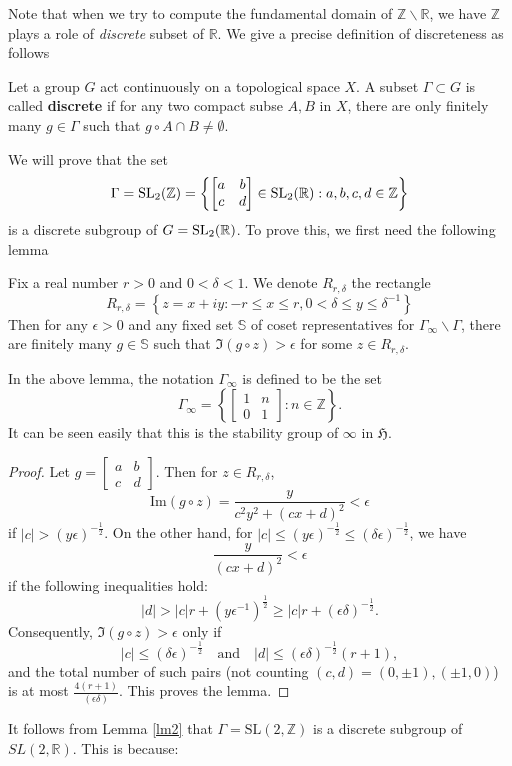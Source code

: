 Note that when we try to compute the fundamental domain of $\mathbb{Z}\backslash \mathbb{R}$, we have $\mathbb{Z}$ plays a role of
\textit{discrete} subset of $\mathbb{R}$. We give a precise definition of discreteness as follows
\begin{definition}
  Let a group $G$ act continuously on a topological space $X$. A subset $\Gamma \subset G$ is called \textbf{discrete} if for any two compact subse
  $A,B$ in $X$, there are only finitely many $g \in \Gamma$ such that $g \circ A \cap B \ne \emptyset$.
\end{definition}
We will prove that the set
\[\Gamma = \operatorname{SL_2(\mathbb{Z})} = \left\lbrace \begin{bmatrix}
    a & b \\
    c & d
  \end{bmatrix} \in \operatorname{SL_2(\mathbb{R})}: a, b, c, d \in \mathbb{Z}\right\rbrace\]
is a discrete subgroup of $G = \operatorname{SL_2(\mathbb{R})}$.
To prove this, we first need the following lemma
\begin{lemma}\label{lm2}
  Fix a real number $r>0$ and $0<\delta<1$. We denote $R_{r,\delta}$ the rectangle
  \[R_{r,\delta} = \left\lbrace z = x+iy: -r \le x \le r, 0 <\delta \le y \le \delta^{-1}\right\rbrace\]
  Then for any $\epsilon >0$ and any fixed set $\mathbb{S}$ of coset representatives for $\Gamma_\infty\backslash \Gamma$, there are finitely
  many $g \in \mathbb{S}$ such that $\Im(g\circ z)>\epsilon$ for some $z \in R_{r,\delta}$.
\end{lemma}
In the above lemma, the notation $\Gamma_\infty$ is defined to be the set
\[ \Gamma_\infty = \left\lbrace\begin{bmatrix}
    1 & n \\
    0 & 1
  \end{bmatrix}: n \in \mathbb{Z} \right\rbrace.\] It can be seen easily that this is the
stability group of $\infty$ in $\mathfrak{H}$.
\begin{proof}
  Let \( g = \begin{bmatrix} a & b \\ c & d \end{bmatrix} \). Then for \( z \in R_{r, \delta} \),
  \[
    \text{Im}(g \circ z) = \frac{y}{c^2 y^2 + (cx + d)^2} < \epsilon
  \]
  if \( |c| > (y \epsilon)^{-\frac{1}{2}} \). On the other hand, for \( |c| \leq (y \epsilon)^{-\frac{1}{2}} \leq (\delta \epsilon)^{-\frac{1}{2}} \), we have
  \[
    \frac{y}{(cx + d)^2} < \epsilon
  \]
  if the following inequalities hold:
  \[
    |d| > |c| r + (y \epsilon^{-1})^{\frac{1}{2}} \geq |c| r + (\epsilon \delta)^{-\frac{1}{2}}.
  \]
  Consequently, \(\Im(g \circ z) > \epsilon\) only if
  \[
    |c| \leq (\delta \epsilon)^{-\frac{1}{2}} \quad \text{and} \quad |d| \leq (\epsilon \delta)^{-\frac{1}{2}} (r + 1),
  \]
  and the total number of such pairs (not counting $(c, d) = (0, \pm 1), (\pm 1, 0)$) is at most $\frac{4(r+1)} {(\epsilon \delta)}$. This proves the lemma.
\end{proof}
It follows from Lemma \ref{lm2} that $\Gamma = \text{SL}(2, \mathbb{Z})$ is a discrete subgroup of $SL(2, \mathbb{R})$. This is because:

